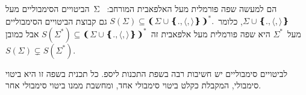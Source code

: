 הביטויים הסימבוליים מעל~Σ הם למעשה שפה פורמלית מעל האלפאבית
המורחב:~$Σ∪❴.,⟨,⟩❵$, כלומר~$S(Σ)⊆❨Σ∪❴.,⟨,⟩❵❩^*.$ גם קבוצת הביטויים הסימבוליים
מעל~$Σ^*$ היא שפה פורמלית מעל אלפאבית זה~$S(Σ^*)⊆❨Σ∪❴.,⟨,⟩❵❩^*$ אבל
כמובן~$S(Σ)⊊ S(Σ^*)$.

לביטויים סימבוליים יש חשיבות רבה בשפת התכנות ליספ. כל תכנית בשפה זו היא ביטוי
סימבולי, המקבלת כקלט ביטוי סימבולי אחד, ומחשבת ממנו ביטוי סימבולי אחר.


